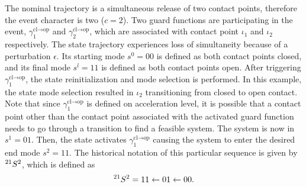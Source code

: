 \documentclass[../DC2017114Bouma.tex]{subfiles}
\begin{document}
The nominal trajectory is a simultaneous release of two contact points, therefore the event character is two ($c = 2$). Two guard functions are participating in the event, $\gamma_1^{\textrm{cl}\rightarrow\textrm{op}}$ and $\gamma_2^{\textrm{cl}\rightarrow\textrm{op}}$, which are associated with contact point $\iota_1$ and $\iota_2$ respectively. The state trajectory experiences loss of simultaneity because of a perturbation $\epsilon$. Its starting mode $s^0 = 00$ is defined as both contact points closed, and its final mode $s^l = 11$ is defined as both contact points open. After triggering $\gamma_1^{\textrm{cl}\rightarrow\textrm{op}}$, the state reinitialization and mode selection is performed. In this example, the state mode selection resulted in $\iota_2$ transitioning from closed to open contact. Note that since $\gamma_1^{\textrm{cl}\rightarrow\textrm{op}}$ is defined on acceleration level, it is possible that a contact point other than the contact point associated with the activated guard function needs to go through a transition to find a feasible system. The system is now in $s^1 = 01$. Then, the state activates $\gamma_1^{\textrm{cl}\rightarrow\textrm{op}}$ causing the system to enter the desired end mode $s^2 = 11$. The historical notation of this particular sequence is given by $\hspace{0cm}^{21}S^2$, which is defined as
\begin{align}
\hspace{0cm}^{21}S^2 = 11 \leftarrow 01 \leftarrow 00.
\end{align}
\end{document}
